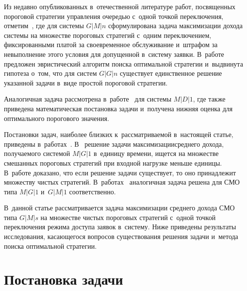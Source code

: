 \begin{multicols}{2}
Из недавно опубликованных 
в~отечественной литературе работ,  посвященных пороговой стратегии
управления очередью с~одной  точкой переключения, отметим~\cite{3-aga}, где
для системы $G|M|n$ сформулирована задача максимизации дохода
сис\-те\-мы на множестве пороговых стратегий с~одним переключением,
фиксированными платой за своевременное обслуживание и~штрафом за
невыполнение этого условия для допущенной в~сис\-те\-му заявки. 
В~работе предложен эвристический алгоритм поиска оптимальной
стратегии и~выдвинута гипотеза о~том, что для сис\-тем $G|G|n$
существует единственное решение указанной задачи в~виде прос\-той
пороговой стратегии. 

Аналогичная задача рас\-смот\-ре\-на в~работе~\cite{4-aga}
для сис\-те\-мы $M|D|1$, где также приведена математическая постановка
задачи и~получена нижняя оценка для оптимального порогового
значения. 

Постановки задач, наиболее близких к~рас\-смат\-ри\-ва\-емой в~настоящей статье, 
приведены в~работах~\cite{5-aga, 6-aga, 7-aga}. В~\cite{5-aga}
решение задачи максимизации\linebreak средне\-го дохода, получаемого сис\-те\-мой
$M|G|1$ в~единицу времени, ищется на множестве смешанных пороговых
стратегий при входной нагрузке меньше единицы. В~работе доказано,
что если решение задачи существует, то оно принадлежит множеству
чистых стратегий. В~работах~\cite{6-aga, 7-aga} аналогичная задача решена
для СМО типа $M|G|1$ и~$G|M|1$ соответственно. 

В~данной статье
рассматривается задача максимизации среднего дохода СМО типа
$G|M|s$ на множестве чистых пороговых стратегий с~одной точкой
переключения режима доступа заявок в~сис\-те\-му. Ниже приведены
результаты исследования, касающегося вопросов существования решения
задачи и~метода поиска оптимальной стратегии.



\section{Постановка задачи}


\end{multicols}
